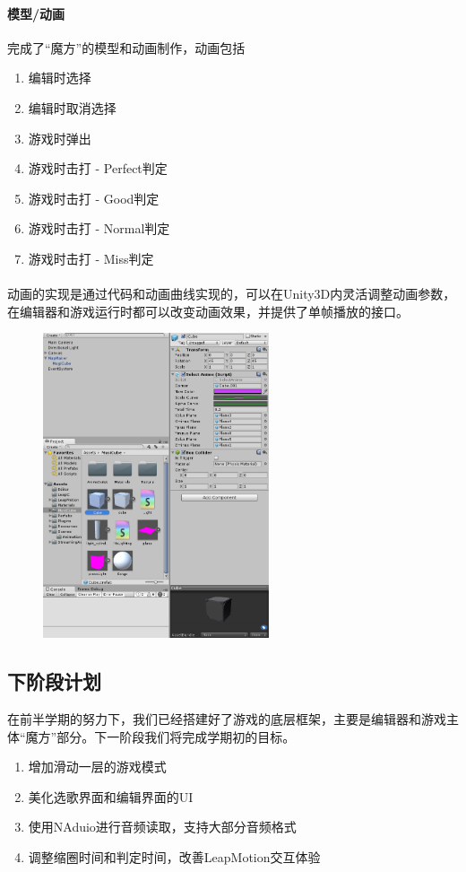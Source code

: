 \documentclass{article}
\begin{document}
\paragraph{模型/动画}
完成了“魔方”的模型和动画制作，动画包括
\begin{enumerate}
  \item 编辑时选择
  \item 编辑时取消选择
  \item 游戏时弹出
  \item 游戏时击打 - Perfect判定
  \item 游戏时击打 - Good判定
  \item 游戏时击打 - Normal判定
  \item 游戏时击打 - Miss判定
\end{enumerate}
\paragraph{}
动画的实现是通过代码和动画曲线实现的，可以在Unity3D内灵活调整动画参数，在编辑器和游戏运行时都可以改变动画效果，并提供了单帧播放的接口。
\begin{figure}[H]
  \centering
  \includegraphics[width=18em]{work1.png}\\
  \caption{}\label{}
\end{figure}
\newpage
\subsection{下阶段计划}
在前半学期的努力下，我们已经搭建好了游戏的底层框架，主要是编辑器和游戏主体“魔方”部分。下一阶段我们将完成学期初的目标。
\begin{enumerate}
  \item 增加滑动一层的游戏模式
  \item 美化选歌界面和编辑界面的UI
  \item 使用NAduio进行音频读取，支持大部分音频格式
  \item 调整缩圈时间和判定时间，改善LeapMotion交互体验
\end{enumerate}
\end{document}
